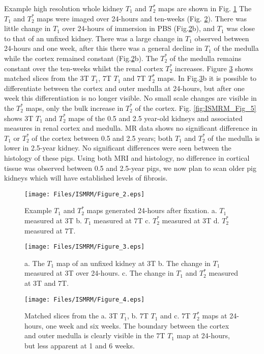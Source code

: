 Example high resolution whole kidney $T_1$ and $T_2^*$ maps are shown in Fig. \ref{fig:ISMRM_Fig_2} The $T_1$ and $T_2^*$ maps were imaged over 24-hours and ten-weeks (Fig. \ref{fig:ISMRM_Fig_3}). There was little change in $T_1$ over 24-hours of immersion in PBS (Fig.\ref{fig:ISMRM_Fig_3}b), and $T_1$ was close to that of an unfixed kidney. There was a large change in $T_1$ observed between 24-hours and one week, after this there was a general decline in $T_1$ of the medulla while the cortex remained constant (Fig.\ref{fig:ISMRM_Fig_3}b). The $T_2^*$ of the medulla remains constant over the ten-weeks whilst the renal cortex $T_2^*$ increases. Figure \ref{fig:ISMRM_Fig_4} shows matched slices from the 3T $T_1$, 7T $T_1$ and 7T $T_2^*$ maps. In Fig.\ref{fig:ISMRM_Fig_4}b it is possible to differentiate between the cortex and outer medulla at 24-hours, but after one week this differentiation is no longer visible. No small scale changes are visible in the $T_2^*$ maps, only the bulk increase in $T_2^*$ of the cortex. Fig. \ref{fig:ISMRM_Fig_5} shows 3T $T_1$ and $T_2^*$ maps of the 0.5 and 2.5 year-old kidneys and associated measures in renal cortex and medulla. MR data shows no significant difference in $T_1$ or $T_2^*$ of the cortex between 0.5 and 2.5 years; both $T_1$ and $T_2^*$ of the medulla is lower in 2.5-year kidney. No significant differences were seen between the histology of these pigs. Using both MRI and histology, no difference in cortical tissue was observed between 0.5 and 2.5-year pigs, we now plan to scan older pig kidneys which will have established levels of fibrosis. 

\begin{figure}[H]
	\centering
	\texttt{[image: Files/ISMRM/Figure\_2.eps]}
	\caption{Example $T_1$ and $T_2^*$ maps generated 24-hours after fixation. a. $T_1$ measured at 3T b. $T_1$ measured at 7T c. $T_2^*$ measured at 3T d. $T_2^*$ measured at 7T.}
	\label{fig:ISMRM_Fig_2}
\end{figure}

\begin{figure}[H]
	\centering
	\texttt{[image: Files/ISMRM/Figure\_3.eps]}
	\caption{a. The $T_1$ map of an unfixed kidney at 3T b. The change in $T_1$ measured at 3T over 24-hours. c. The change in $T_1$ and $T_2^*$ measured at 3T and 7T.
	}
	\label{fig:ISMRM_Fig_3}
\end{figure}

\begin{figure}[H]
	\centering
	\texttt{[image: Files/ISMRM/Figure\_4.eps]}
	\caption{Matched slices from the a. 3T $T_1$, b. 7T $T_1$ and c. 7T $T_2^*$ maps at 24-hours, one week and six weeks. The boundary between the cortex and outer medulla is clearly visible in the 7T $T_1$ map at 24-hours, but less apparent at 1 and 6 weeks.}
	\label{fig:ISMRM_Fig_4}
\end{figure}

